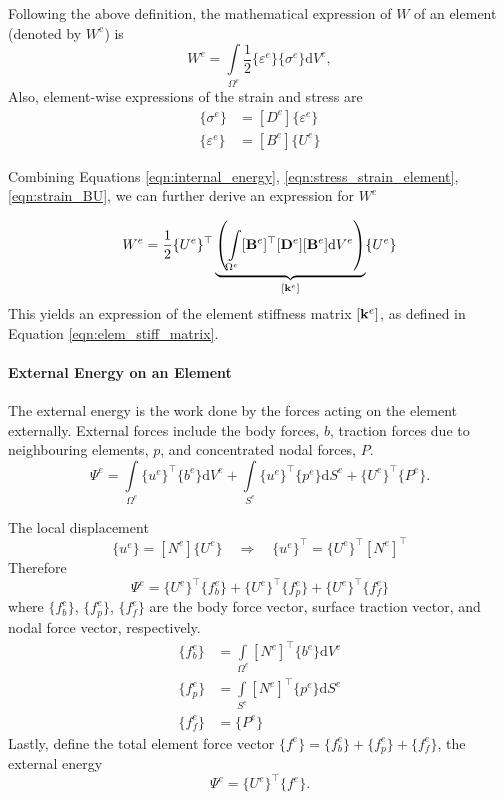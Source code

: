 \documentclass[12pt, a4paper]{article}
\numberwithin{equation}{section}
\begin{document}
Following the above definition, the mathematical expression of $W$ of an element (denoted by $W^e$) is
\begin{equation}
\label{eqn:internal_energy}
    W^e = \int \limits_{\Omega^e} \frac{1}{2} \{\varepsilon^e\} \{\sigma^e\} \mathrm{d} V^e,
\end{equation}
Also, element-wise expressions of the strain and stress are
\begin{align}
\label{eqn:stress_strain_element}
    \{\sigma^e\} & = [D^e] \{\varepsilon^e\} \\
\label{eqn:strain_BU}
    \{\varepsilon^e\} & = [B^e] \{U^e\}
\end{align}

Combining Equations \ref{eqn:internal_energy}, \ref{eqn:stress_strain_element}, \ref{eqn:strain_BU}, we can further derive an expression for $W^e$ 

\begin{equation}
    W^e = \frac{1}{2} \{U^e\}^\top \underbrace{\left( \int \limits_{\Omega^e} [\mathbf{B}^e]^\top [\mathbf{D}^e] [\mathbf{B}^e] \mathrm{d} V^e \right)}_{[\mathbf{k}^e]} \{U^e\}
\end{equation}
This yields an expression of the element stiffness matrix $[\mathbf{k}^e]$, as defined in Equation \ref{eqn:elem_stiff_matrix}.

\paragraph{External Energy on an Element}
The external energy is the work done by the forces acting on the element externally. External forces include the body forces, $b$, traction forces due to neighbouring elements, $p$, and concentrated nodal forces, $P$.
\begin{equation}
    \Psi^e = \int \limits_{\Omega^e} \{u^e\}^\top \{b^e\} \mathrm{d}V^e + \int \limits_{S^e} \{u^e\}^\top \{p^e\} \mathrm{d}S^e + \{U^e\}^\top \{P^e\}.
\end{equation}


The local displacement
\begin{equation}
    \{u^e\} = [N^e] \{U^e\}
    \quad \Rightarrow \quad
    \{u^e\}^\top = \{U^e\}^\top [N^e]^\top
\end{equation}
Therefore
\begin{equation}
    \Psi^e = \{U^e\}^\top \{f_b^e\} + \{U^e\}^\top \{f_p^e\} + \{U^e\}^\top \{f_f^e\}
\end{equation}
where $\{f_b^e \}$, $\{f_p^e\}$, $\{f_f^e\}$ are the body force vector, surface traction vector, and nodal force vector, respectively.
\begin{align}
    \{f_b^e\} & = \int \limits_{\Omega^e} [N^e]^\top \{b^e\} \mathrm{d}V^e \\
    \{f_p^e\} & = \int \limits_{S^e} [N^e]^\top \{p^e\} \mathrm{d}S^e \\
    \{f_f^e\} & = \{P^e\}
\end{align}
Lastly, define the total element force vector $\{f^e\} = \{f_b^e\} + \{f_p^e\} + \{f_f^e\}$, the external energy
\begin{equation}
    \Psi^e = \{U^e\}^\top \{f^e\}.
\end{equation}
\end{document}
